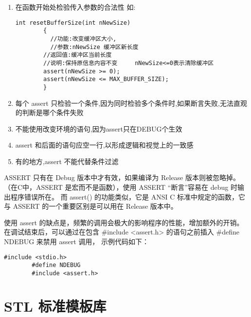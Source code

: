 \begin{enumerate}
    \item 在函数开始处检验传入参数的合法性
          如:
          \begin{lstlisting}[frame=shadowbox]
        int resetBufferSize(int nNewSize)
        {
          //功能:改变缓冲区大小,
          //参数:nNewSize 缓冲区新长度
        //返回值:缓冲区当前长度
        //说明:保持原信息内容不变     nNewSize<=0表示清除缓冲区
        assert(nNewSize >= 0);
        assert(nNewSize <= MAX_BUFFER_SIZE);
        }
        \end{lstlisting}
    \item 每个 assert 只检验一个条件,因为同时检验多个条件时,如果断言失败,无法直观的判断是哪个条件失败

    \item 不能使用改变环境的语句,因为assert只在DEBUG个生效

    \item assert 和后面的语句应空一行,以形成逻辑和视觉上的一致感

    \item 有的地方,assert 不能代替条件过滤
\end{enumerate}



ASSERT 只有在 Debug 版本中才有效，如果编译为 Release 版本则被忽略掉。
（在C中，ASSERT 是宏而不是函数），使用 ASSERT “断言”容易在 debug 时输出程序错误所在。
而 assert() 的功能类似，它是 ANSI C 标准中规定的函数，它与 ASSERT 的一个重要区别是可以用在 Release 版本中。

使用 assert 的缺点是，频繁的调用会极大的影响程序的性能，增加额外的开销。
在调试结束后，可以通过在包含 \#include <assert.h> 的语句之前插入 \#define NDEBUG 来禁用 assert 调用，
示例代码如下：
\begin{lstlisting}[frame=shadowbox]
        #include <stdio.h>
        #define NDEBUG
        #include <assert.h>
    \end{lstlisting}


\section{STL 标准模板库}

\newpage